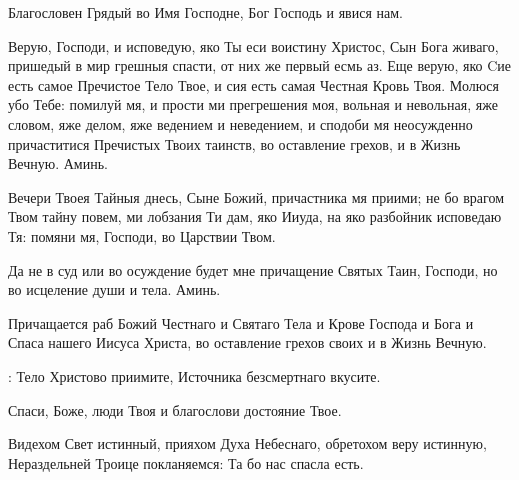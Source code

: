 \begin{mymulticols}

 Благословен Грядый во Имя Господне, Бог Господь и явися нам.


 Верую, Господи, и исповедую, яко Ты еси воистину Христос, Сын Бога живаго, пришедый в мир грешныя спасти, от них же первый есмь аз. Еще верую, яко Cие есть самое Пречистое Тело Твое, и сия есть самая Честная Кровь Твоя. Молюся убо Тебе: помилуй мя, и прости ми прегрешения моя, вольная и невольная, яже словом, яже делом, яже ведением и неведением, и сподоби мя неосужденно причаститися Пречистых Твоих таинств, во оставление грехов, и в Жизнь Вечную. Аминь.

Вечери Твоея Тайныя днесь, Сыне Божий, причастника мя приими; не бо врагом Твом тайну повем, ми лобзания Ти дам, яко Ииуда, на яко разбойник исповедаю Тя: помяни мя, Господи, во Царствии Твом.

Да не в суд или во осуждение будет мне причащение Святых Таин, Господи, но во исцеление души и тела. Аминь.


 Причащается раб Божий  Честнаго и Святаго Тела и Крове Господа и Бога и Спаса нашего Иисуса Христа, во оставление грехов своих и в Жизнь Вечную. 

: Тело Христово приимите, Источника безсмертнаго вкусите.


 Спаси, Боже, люди Твоя и благослови достояние Твое.


 Видехом Свет истинный, прияхом Духа Небеснаго, обретохом веру истинную, Нераздельней Троице покланяемся: Та бо нас спасла есть.



\end{mymulticols}
